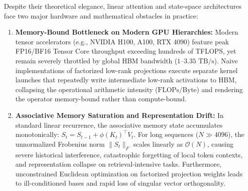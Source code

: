 Despite their theoretical elegance, linear attention and state-space architectures face two major hardware and mathematical obstacles in practice:
\begin{enumerate}
    \item \textbf{Memory-Bound Bottleneck on Modern GPU Hierarchies:} Modern tensor accelerators (e.g., NVIDIA H100, A100, RTX 4090) feature peak FP16/BF16 Tensor Core throughput exceeding hundreds of TFLOPS, yet remain severely throttled by global HBM bandwidth ($1$--$3.35\text{ TB/s}$). Naive implementations of factorized low-rank projections execute separate kernel launches that repeatedly write intermediate low-rank activations to HBM, collapsing the operational arithmetic intensity ($\text{FLOPs}/\text{Byte}$) and rendering the operator memory-bound rather than compute-bound.
    \item \textbf{Associative Memory Saturation and Representation Drift:} In standard linear recurrence, the associative memory state accumulates monotonically: $S_t = S_{t-1} + \phi(K_t)^\top V_t$. For long sequences ($N \gg 4096$), the unnormalized Frobenius norm $\|S_t\|_F$ scales linearly as $\mathcal{O}(N)$, causing severe historical interference, catastrophic forgetting of local token contexts, and representation collapse on retrieval-intensive tasks. Furthermore, unconstrained Euclidean optimization on factorized projection weights leads to ill-conditioned bases and rapid loss of singular vector orthogonality.
\end{enumerate}

